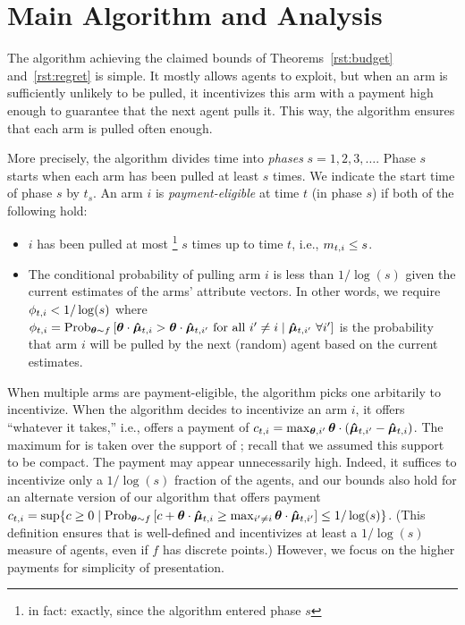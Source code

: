 \section{Main Algorithm and Analysis}
\label{sec:ub}
The algorithm achieving the claimed bounds of
Theorems~\ref{rst:budget} and~\ref{rst:regret} is simple.
It mostly allows agents to exploit, but when an arm is sufficiently
unlikely to be pulled,
it incentivizes this arm with a payment high enough
to guarantee that the next agent pulls it.
This way, the algorithm ensures that each arm is pulled often enough.

More precisely, the algorithm divides time into \emph{phases}
$s = 1, 2, 3, \ldots$.
Phase $s$ starts when each arm has been pulled at least $s$ times.
We indicate the start time of phase $s$ by $t_s$. An arm $i$ is \emph{payment-eligible} at time $t$ (in phase $s$)
if both of the following hold:

\begin{itemize}
\item $i$ has been pulled at most%
\footnote{in fact: exactly, since the algorithm entered phase $s$}
$s$ times up to time $t$, i.e., $m_{t,i} \leq s$.
\item 
The conditional probability of pulling arm $i$ is less than
$1/\log(s)$ given the current estimates  of the arms'
attribute vectors.  In other words, we require
$\phi_{t,i} < 1/\log(s)$ where 
$\PullProb{t}{i} = \Prob[\AgV \sim \AgentDist]{\AgV \cdot \ArmEV{t}{i} > \AgV
\cdot \ArmEV{t}{i'} \mbox{ for all } i' \neq i \mid \ArmEV{t}{i'}\ \forall i'}$
is the probability that arm $i$ will be pulled
by the next (random) agent based on the current estimates. 
\end{itemize}


When multiple arms are payment-eligible, the algorithm picks one arbitarily to incentivize.
When the algorithm decides to incentivize an arm $i$,
it offers ``whatever it takes,'' i.e., offers a payment of
$c_{t,i} = \max_{\bm{\theta},i'} \bm{\theta} \cdot (\bm{\hat{\mu}}_{t,i'} - \bm{\hat{\mu}}_{t,i})$.
The maximum for \AgV is taken over the support of \AgentDist;
recall that we assumed this support to be compact.
The payment  may appear unnecessarily high.
Indeed, it suffices to
incentivize only a $1/\log(s)$ fraction of the agents,
and our bounds also hold for an alternate version of our algorithm that 
offers payment
$\Pay{t}{i} = \sup \Set{c \geq 0}{%
\Prob[\AgV \sim \AgentDist]{c + \AgV \cdot \ArmEV{t}{i} \geq \max_{i'\ne i} \AgV \cdot \ArmEV{t}{i'}} \leq 1/\log(s)}$.
(This definition ensures that  is well-defined
and incentivizes at least a $1/\log(s)$ measure of agents,
even if $f$ has discrete points.)
However, we focus on the higher payments for simplicity of presentation.

